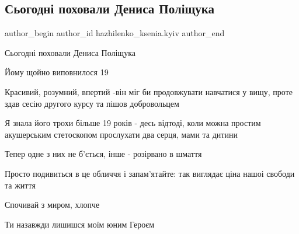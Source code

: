  
 
 
 
 
 
\subsection{Сьогодні поховали Дениса Поліщука}
\label{sec:02_12_2022.fb.hazhilenko_ksenia.kyiv.1.denys_polischuk}
 
\ifcmt
 author_begin
   author_id hazhilenko_ksenia.kyiv
 author_end
\fi

Сьогодні поховали Дениса Поліщука

Йому щойно виповнилося 19

Красивий, розумний, впертий -він міг би продовжувати навчатися у вищу, проте
здав сесію другого курсу та пішов добровольцем 

Я знала його трохи більше 19 років - десь відтоді, коли можна простим
акушерським стетоскопом прослухати два серця, мами та дитини

Тепер одне з них не б'ється, інше - розірвано в шмаття 

Просто подивиться в це обличчя і запам'ятайте: так виглядає ціна нашоі свободи
та життя

Спочивай з миром, хлопче

Ти назавжди лишишся моїм юним Героєм
